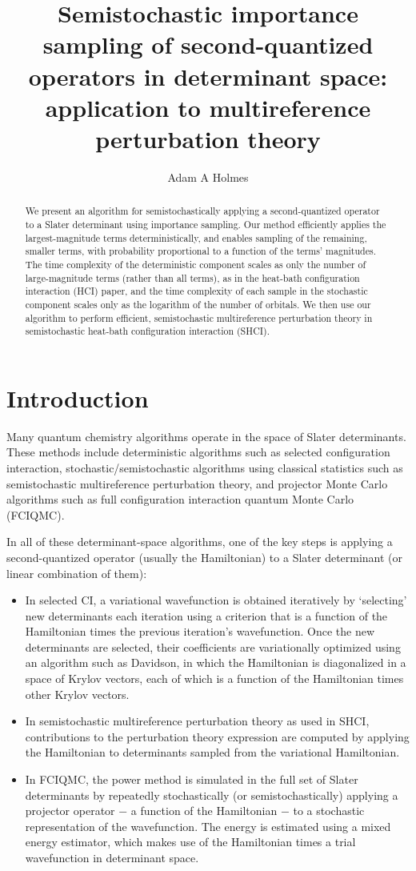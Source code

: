 \documentclass[english]{article}
\title{Semistochastic importance sampling of second-quantized operators in determinant space: application to multireference perturbation theory}
\author{Adam A Holmes}
\begin{document}
\maketitle

\begin{abstract}
We present an algorithm for semistochastically applying a second-quantized operator to a Slater determinant using importance sampling. Our method efficiently applies the largest-magnitude terms deterministically, and enables sampling of the remaining, smaller terms, with probability proportional to a function of the terms' magnitudes. The time complexity of the deterministic component scales as only the number of large-magnitude terms (rather than all terms), as in the heat-bath configuration interaction (HCI) paper, and the time complexity of each sample in the stochastic component scales only as the logarithm of the number of orbitals. We then use our algorithm to perform efficient, semistochastic multireference perturbation theory in semistochastic heat-bath configuration interaction (SHCI).
\end{abstract}

\section{Introduction}
Many quantum chemistry algorithms operate in the space of Slater determinants. These methods include deterministic algorithms such as selected configuration interaction, stochastic/semistochastic algorithms using classical statistics such as semistochastic multireference perturbation theory, and projector Monte Carlo algorithms such as full configuration interaction quantum Monte Carlo (FCIQMC).

In all of these determinant-space algorithms, one of the key steps is applying a second-quantized operator (usually the Hamiltonian) to a Slater determinant (or linear combination of them):
\begin{itemize}
\item In selected CI, a variational wavefunction is obtained iteratively by `selecting' new determinants each iteration using a criterion that is a function of the Hamiltonian times the previous iteration's wavefunction. Once the new determinants are selected, their coefficients are variationally optimized using an algorithm such as Davidson, in which the Hamiltonian is diagonalized in a space of Krylov vectors, each of which is a function of the Hamiltonian times other Krylov vectors.
\item In semistochastic multireference perturbation theory as used in SHCI, contributions to the perturbation theory expression are computed by applying the Hamiltonian to determinants sampled from the variational Hamiltonian.
\item In FCIQMC, the power method is simulated in the full set of Slater determinants by repeatedly stochastically (or semistochastically) applying a projector operator $-$ a function of the Hamiltonian $-$ to a stochastic representation of the wavefunction. The energy is estimated using a mixed energy estimator, which makes use of the Hamiltonian times a trial wavefunction in determinant space.
\end{itemize}
\end{document}
